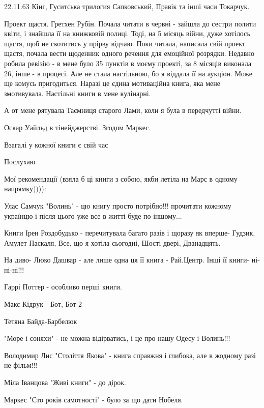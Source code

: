 
22.11.63 Кінг, Гуситська трилогия Сапковський, Правік та інші часи Токарчук.


Проект щастя. Гретхен Рубін. Почала читати в червні - зайшла до сестри полити
квіти, і знайшла її на книжковій полиці. Тоді, на 5 місяць війни, дуже хотілось
щастя, щоб не скотитись у прірву відчаю. Поки читала, написала свій проект
щастя, почала вести щоденник одного речення для емоційної розрядки. Недавно
робила ревізію - в мене було 35 пунктів в моєму проекті, за 8 місяців виконала
26, інше - в процесі. Але не стала настільною, бо я віддала її на аукціон. Може
ще комусь пригодиться. Наразі це єдина мотиваційна книга, яка мене змотивувала.
Настільні книги в мене кулінарні.


А от мене рятувала Таємниця старого Лами, коли я була в передчутті війни.

Оскар Уайльд в тінейджерстві. Згодом Маркес.

Взагалі у кожної книги є свій час


Послухаю


Мої рекомендації (взяла б ці книги з собою, якби летіла на Марс в одному
напрямку)))):

Улас Самчук "Волинь" - цю книгу просто потрібно!!! прочитати кожному українцю і
після цього уже все в житті буде по-іншому...

Книги Ірен Роздобудько - перечитувала багато разів і щоразу як вперше- Гудзик,
Амулет Паскаля, Все, що я хотіла сьогодні, Шості двері, Дванадцять.

На диво- Люко Дашвар - але лише одна ця її книга - Рай.Центр. Інші її книги-
ні-ні-ні!!!

Гаррі Поттер - особливо перші книги.

Макс Кідрук - Бот, Бот-2

Тетяна Байда-Барбелюк

"Море і соняхи" - не можна відірватись, і це про нашу Одесу і Волинь!!!

Володимир Лис "Століття Якова" - книга справжня і глибока, але в жодному разі
не фільм!!!

Міла Іванцова "Живі книги" - до дірок.

Маркес "Сто років самотності" - було за що дати Нобеля.

